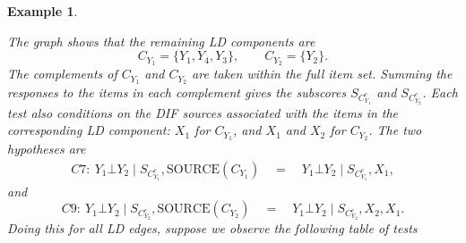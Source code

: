 \documentclass[12pt]{article}
\newcommand{\coauthortodo}[1]{%
  \marginnote{%
    \begin{tcolorbox}[
      width=\marginparwidth,
      colback=yellow!15!white, colframe=orange!70!black,
      colbacktitle=yellow!35!white, coltitle=black,
      title=TODO, fonttitle=\bfseries\scriptsize,
      toptitle=2pt, bottomtitle=2pt,
      fontupper=\scriptsize, boxrule=0.4pt, arc=1mm,
      boxsep=0pt, left=2pt, right=2pt, top=3pt, bottom=3pt,
      before skip=0pt, after skip=0pt
    ]
      \raggedright #1
    \end{tcolorbox}%
  }%
}
\theoremstyle{examplestyle}
\newtheorem{example}{Example}[section]
\begin{document}
\begin{mybox3}
\begin{example}
\begin{center}
\end{center}


The graph shows that the remaining LD components are
\begin{equation}
    C_{Y_1}=\{Y_1,Y_4,Y_3\},\qquad C_{Y_2}=\{Y_2\}.
\end{equation}
The complements of $C_{Y_1}$ and $C_{Y_2}$ are taken within the full item set. Summing the responses to the items in each complement gives the subscores $S_{C_{Y_1}^c}$ and $S_{C_{Y_2}^c}$. Each test also conditions on the DIF sources associated with the items in the corresponding LD component: $X_1$ for $C_{Y_1}$, and $X_1$ and $X_2$ for $C_{Y_2}$. The two hypotheses are
\begin{align*}
    C7:\ Y_1\bot Y_2\mid S_{C_{Y_1}^c},\text{SOURCE}(C_{Y_1}) \quad = \quad Y_1\bot Y_2\mid S_{C_{Y_1}^c},X_1,
\end{align*}
and
\begin{equation*}
    C9:\ Y_1\bot Y_2\mid S_{C_{Y_2}^c},\text{SOURCE}(C_{Y_2}) \quad = \quad Y_1\bot Y_2\mid S_{C_{Y_2}^c},X_2,X_1.
\end{equation*}
Doing this for all LD edges, suppose we observe the following table of tests



\end{example}
\end{mybox3}
\end{document}

